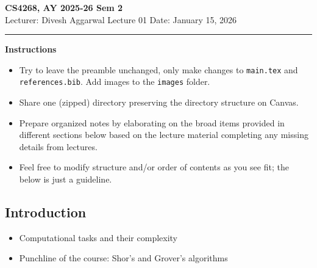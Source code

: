 



% 


\newpage
\noindent
\textbf{CS4268, AY 2025-26 Sem 2}
\\
\noindent
Lecturer: Divesh Aggarwal
\hfill
Lecture 01                      %
\hfill
Date: January 15, 2026          %


\noindent
\rule{\textwidth}{1pt}

\medskip

\textbf{Instructions}\\
\begin{itemize}
    \item Try to leave the preamble unchanged, only make changes to \texttt{main.tex} and  \texttt{references.bib}. Add images to the \texttt{images} folder. 
    \item Share one (zipped) directory preserving the directory structure on Canvas. 
    \item Prepare organized notes by elaborating on the broad items provided in different sections below based on the lecture material completing any missing details from lectures.
    \item Feel free to modify structure and/or order of contents as you see fit; the below is just a guideline.
\end{itemize} 


\subsection{Introduction}
\begin{itemize}
    \item Computational tasks and their complexity
    \item Punchline of the course: Shor's and Grover's algorithms
\end{itemize}

